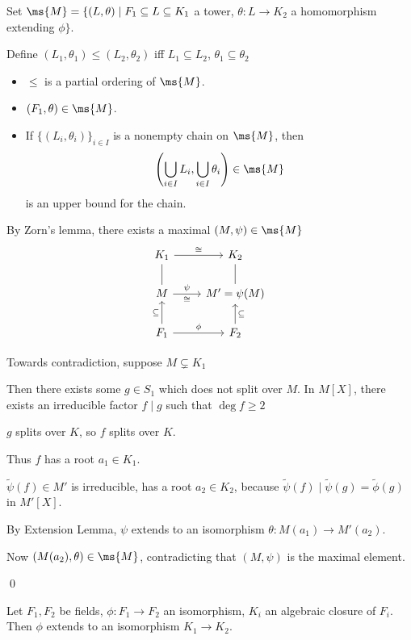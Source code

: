 \documentclass[x11names,reqno,14pt]{extarticle}
\begin{document}
\proof

Set $\ms{M}= \{(L,\theta) \mid F_1 \subseteq L \subseteq K_1$ a tower, $\theta:L\to K_2$ a homomorphism extending $\phi\}$. 

Define $(L_1,\theta_1) \leq (L_2, \theta_2)$ iff $L_1 \subseteq L_2$, $\theta_1 \subseteq \theta_2$

\begin{itemize}

\item $\leq$ is a partial ordering of $\ms{M}$. 

\item $(F_1, \theta) \in \ms{M}$. 

\item If $\{(L_i,\theta_i)\}_{i\in I}$ is a nonempty chain on $\ms{M}$, then 
\[
\left(\bigcup_{i\in I} L_i, \bigcup_{i\in I}\theta_i\right) \in \ms{M}
\]
is an upper bound for the chain. 

\end{itemize}

By Zorn's lemma, there exists a maximal $(M, \psi) \in \ms{M}$
\[
\begin{tikzcd}
K_1 \ar[r, "\cong"] \ar[d, dash] & K_2 \ar[d, dash] \\
M \ar[r, "\psi","\cong"'] & M' = \psi(M) \\
F_1 \ar[u, "\subseteq"] \ar[r, "\phi"] & F_2 \ar[u, "\subseteq"']
\end{tikzcd}
\]

Towards contradiction, suppose $M \subsetneq K_1$

Then there exists some $g \in S_1$ which does not split over $M$. In $M[X]$, there exists an irreducible factor $f\mid g$ such that $\deg f \geq 2$

$g$ splits over $K$, so $f$ splits over $K$. 

Thus $f$ has a root $a_1 \in K_1$. 

$\tilde{\psi}(f)\in M'$ is irreducible, has a root $a_2 \in K_2$, because $\tilde{\psi}(f) \mid \tilde{\psi}(g) = \tilde{\phi}(g)$ in $M'[X]$. 

By Extension Lemma, $\psi$ extends to an isomorphism $\theta:M(a_1) \to M'(a_2)$.

Now $(M(a_2),\theta) \in \ms{M}$, contradicting that $(M,\psi)$ is the maximal element. 

\qed

\cor

Let $F_1, F_2$ be fields, $\phi:F_1\to F_2$ an isomorphism, $K_i$ an algebraic closure of $F_i$. Then $\phi$ extends to an isomorphism $K_1 \to K_2$. 
\end{document}
